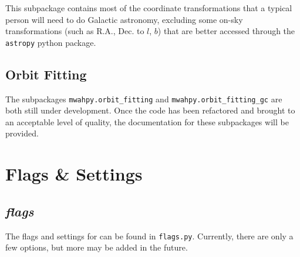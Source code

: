 \documentclass{article}
\begin{document}
This subpackage contains most of the coordinate transformations that a typical person will need to do Galactic astronomy, excluding some on-sky transformations (such as R.A., Dec. to $l$, $b$) that are better accessed through the \verb!astropy! python package. 

\subsection{Orbit Fitting}

The subpackages \verb!mwahpy.orbit_fitting! and \verb!mwahpy.orbit_fitting_gc! are both still under development. Once the code has been refactored and brought to an acceptable level of quality, the documentation for these subpackages will be provided. 

\section{Flags \& Settings}

\subsection{\textit{flags}}

The flags and settings for \mwahpy can be found in \verb!flags.py!. Currently, there are only a few options, but more may be added in the future. 
\end{document}
